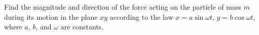 \item Find the magnitude and direction of the force acting on the particle of mass \( m \) during its motion in the plane \( xy \) according to the law \( x = a \sin \omega t \), \( y = b \cos \omega t \), where \( a \), \( b \), and \( \omega \) are constants.